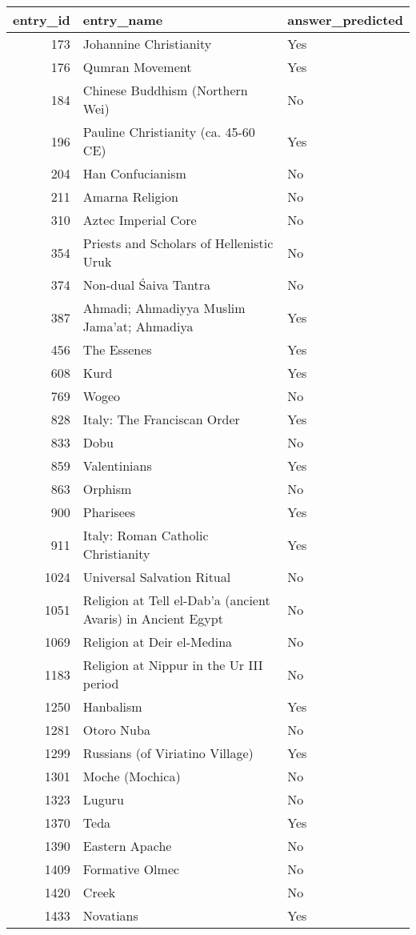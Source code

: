 \begin{tabular}{rll}
\toprule
entry_id & entry_name & answer_predicted \\
\midrule
173 & Johannine Christianity & Yes \\
176 & Qumran Movement & Yes \\
184 & Chinese Buddhism (Northern Wei) & No \\
196 & Pauline Christianity (ca. 45-60 CE) & Yes \\
204 & Han Confucianism & No \\
211 & Amarna Religion & No \\
310 & Aztec Imperial Core & No \\
354 & Priests and Scholars of Hellenistic Uruk & No \\
374 & Non-dual Śaiva Tantra & No \\
387 & Ahmadi; Ahmadiyya Muslim Jama'at; Ahmadiya & Yes \\
456 & The Essenes & Yes \\
608 & Kurd & Yes \\
769 & Wogeo & No \\
828 & Italy: The Franciscan Order & Yes \\
833 & Dobu & No \\
859 & Valentinians & Yes \\
863 & Orphism & No \\
900 & Pharisees & Yes \\
911 & Italy: Roman Catholic Christianity & Yes \\
1024 & Universal Salvation Ritual & No \\
1051 & Religion at Tell el-Dab'a (ancient Avaris) in Ancient Egypt & No \\
1069 & Religion at Deir el-Medina & No \\
1183 & Religion at Nippur in the Ur III period & No \\
1250 & Hanbalism & Yes \\
1281 & Otoro Nuba & No \\
1299 & Russians (of Viriatino Village) & Yes \\
1301 & Moche (Mochica) & No \\
1323 & Luguru & No \\
1370 & Teda & Yes \\
1390 & Eastern Apache & No \\
1409 & Formative Olmec & No \\
1420 & Creek & No \\
1433 & Novatians & Yes \\

\end{tabular}
